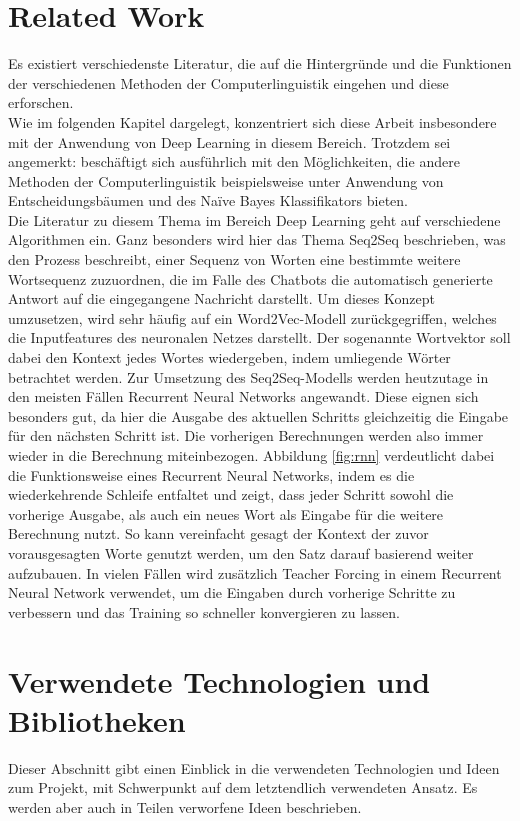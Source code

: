 \documentclass{aa}
\begin{document}
\section{Related Work}
    Es existiert verschiedenste Literatur, die auf die Hintergründe und die Funktionen der verschiedenen Methoden der Computerlinguistik eingehen und diese erforschen.\\
    Wie im folgenden Kapitel dargelegt, konzentriert sich diese Arbeit insbesondere mit der Anwendung von Deep Learning in diesem Bereich. Trotzdem sei angemerkt: \cite{bird} beschäftigt sich ausführlich mit den Möglichkeiten, die andere Methoden der Computerlinguistik beispielsweise unter Anwendung von Entscheidungsbäumen und des Naïve Bayes Klassifikators bieten.\\
    Die Literatur zu diesem Thema im Bereich Deep Learning geht auf verschiedene Algorithmen ein. Ganz besonders wird hier das Thema Seq2Seq beschrieben, was den Prozess beschreibt, einer Sequenz von Worten eine bestimmte weitere Wortsequenz zuzuordnen, die im Falle des Chatbots die automatisch generierte Antwort auf die eingegangene Nachricht darstellt. \cite[Vgl.][S.~1219]{jackson} Um dieses Konzept umzusetzen, wird sehr häufig auf ein Word2Vec-Modell zurückgegriffen, welches die Inputfeatures des neuronalen Netzes darstellt. Der sogenannte Wortvektor soll dabei den Kontext jedes Wortes wiedergeben, indem umliegende Wörter betrachtet werden. \cite[Vgl.][S.~1220]{jackson} Zur Umsetzung des Seq2Seq-Modells werden heutzutage in den meisten Fällen Recurrent Neural Networks angewandt. Diese eignen sich besonders gut, da hier die Ausgabe des aktuellen Schritts gleichzeitig die Eingabe für den nächsten Schritt ist. Die vorherigen Berechnungen werden also immer wieder in die Berechnung miteinbezogen. \cite[Vgl.]{koehrsen} Abbildung \ref{fig:rnn} verdeutlicht dabei die Funktionsweise eines Recurrent Neural Networks, indem es die wiederkehrende Schleife entfaltet und zeigt, dass jeder Schritt sowohl die vorherige Ausgabe, als auch ein neues Wort als Eingabe für die weitere Berechnung nutzt. So kann vereinfacht gesagt der Kontext der zuvor vorausgesagten Worte genutzt werden, um den Satz darauf basierend weiter aufzubauen. In vielen Fällen wird zusätzlich Teacher Forcing in einem Recurrent Neural Network verwendet, um die Eingaben durch vorherige Schritte zu verbessern und das Training so schneller konvergieren zu lassen.
    
\section{Verwendete Technologien und Bibliotheken}
    Dieser Abschnitt gibt einen Einblick in die verwendeten Technologien und Ideen zum Projekt, mit Schwerpunkt auf dem letztendlich verwendeten Ansatz. Es werden aber auch in Teilen verworfene Ideen beschrieben.
\end{document}
